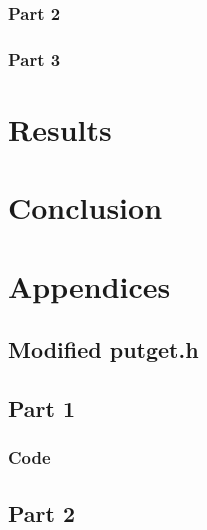 \documentclass[12pt]{article}
\begin{document}
\subsubsection{Part 2}

\subsubsection{Part 3}

\section{Results}



\section{Conclusion}
 


\section{Appendices}
\subsection{Modified putget.h}


\subsection{Part 1}
\subsubsection{Code}
	
\subsection{Part 2}
\end{document}
